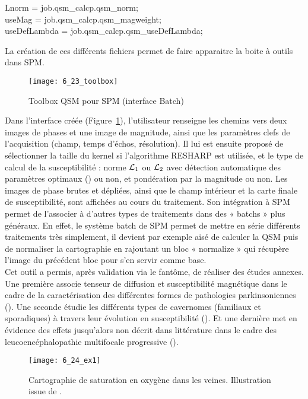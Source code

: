 {{\begin{tabbing}
\> Lnorm = job.qsm\_calcp.qsm\_norm;\\
\> useMag = job.qsm\_calcp.qsm\_magweight;\\
\> useDefLambda = job.qsm\_calcp.qsm\_useDefLambda;\\
\end{tabbing}
}
La création de ces différents fichiers permet de faire apparaitre la boite à outils dans SPM.
\begin{figure}[!t]
\centering
\texttt{[image: 6\_23\_toolbox]}
\caption{Toolbox QSM pour SPM (interface Batch)}
\label{fig:6_23_toolbox}	
\end{figure}
Dans l’interface créée (Figure~\ref{fig:6_23_toolbox}), l’utilisateur renseigne les chemins vers deux images de phases et
une image de magnitude, ainsi que les paramètres clefs de l’acquisition (champ, temps d’échos,
résolution). Il lui est ensuite proposé de sélectionner la taille du kernel si l’algorithme RESHARP est
utilisée, et le type de calcul de la susceptibilité : norme ${\cal L}_1$ ou ${\cal L}_2$ avec détection automatique des
paramètres optimaux (\cite{Bilgic2014}) ou non, et pondération par la magnitude ou non. Les images de phase brutes
et dépliées, ainsi que le champ intérieur et la carte finale de susceptibilité, sont affichées au cours du
traitement. Son intégration à SPM permet de l’associer à d’autres types de traitements dans des
« batchs » plus généraux. En effet, le système batch de SPM permet de mettre en série différents
traitements très simplement, il devient par exemple aisé de calculer la QSM puis de normaliser la
cartographie en rajoutant un bloc « normalize » qui récupère l’image du précédent bloc pour s’en
servir comme base.\\
Cet outil a permis, après validation via le fantôme, de réaliser des études annexes. Une
première associe tenseur de diffusion et susceptibilité magnétique dans le cadre de la caractérisation
des différentes formes de pathologies parkinsoniennes (\cite{Dunet2015}). Une seconde étudie les différents types
de cavernomes (familiaux et sporadiques) à travers leur évolution en susceptibilité (\cite{Balasse2015}). Et une
dernière met en évidence des effets jusqu’alors non décrit dans littérature dans le cadre des
leucoencéphalopathie multifocale progressive (\cite{Carra2015}).\\
\begin{figure}[!t]
\centering
\texttt{[image: 6\_24\_ex1]}
\caption{Cartographie de saturation en oxygène dans les veines. Illustration issue de \cite{Fan2014}.}
\label{fig:6_24_ex1}	
\end{figure}
}
